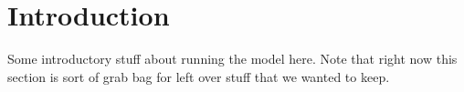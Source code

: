 \section{Introduction}

Some introductory stuff about running the model here. Note that right now this section is sort of grab bag for left over stuff that we wanted to keep. 